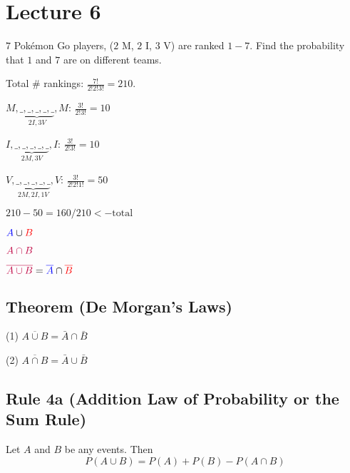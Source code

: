 \section{Lecture 6}

$ 7 $ Pokémon Go players, ($ 2 $ M, $ 2 $ I, $ 3 $ V) are ranked $ 1-7 $.
Find the probability that $ 1 $ and $ 7 $ are on different teams.

Total \# rankings: $\frac{7!}{2!2!3!}=210$.

$ M,\underbrace{\_,\_,\_,\_,\_}_{2I,3V},M $: $ \frac{3!}{2!3!} =10 $

$ I,\underbrace{\_,\_,\_,\_,\_}_{2M,3V},I $: $ \frac{3!}{2!3!} =10 $

$ V,\underbrace{\_,\_,\_,\_,\_}_{2M,2I,1V},V $: $ \frac{3!}{2!2!1!}=50 $

$ 210-50=160/210<-\text{total} $

\textbf{}


$ {\color{blue} A}\cup {\color{red} B} $

\scalebox{0.5}{}

$ {\color{purple} A\cap B }$

\scalebox{0.5}{}

$ {\color{purple}\overline{A\cup B}}={\color{blue}\overline{A}}\cap {\color{red}\overline{B}} $

\scalebox{0.5}{}

\begin{thmbox}
    \subsection{Theorem (De Morgan's Laws)}
    (1) $\overline{A \cup B}=\bar{A}\cap \bar{B}$

    (2) $\overline{A \cap B}=\bar{A}\cup \bar{B}$
\end{thmbox}


\begin{thmbox}
    \subsection{Rule 4a (Addition Law of Probability or the Sum Rule)}
    Let $ A $ and $ B $ be any events. Then
    \[ P(A\cup B)=P(A)+P(B)-P(A\cap B) \]
\end{thmbox}


